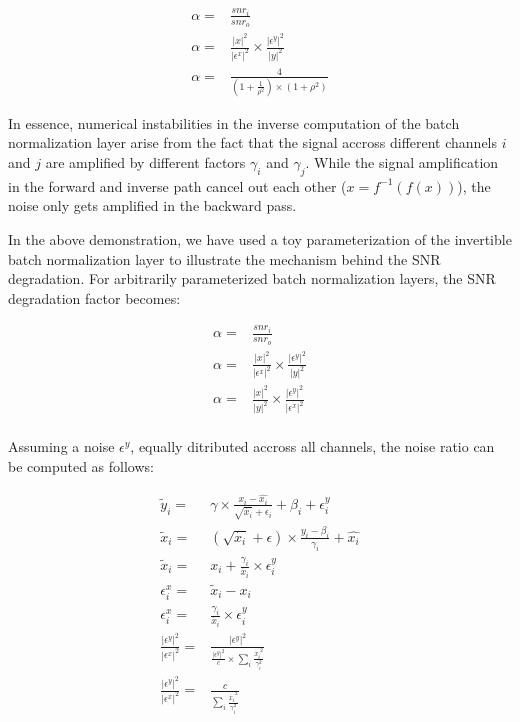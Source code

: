 \documentclass[twocolumn]{bmcart}
\begin{document}
\begin{subequations}
\begin{align}
\alpha =& \frac{snr_i}{snr_o} \\
\alpha =& \frac{|x|^2}{|\epsilon^x|^2} \times  \frac{|\epsilon^y|^2}{|y|^2} \\
\alpha =& \frac{4}{(1+\frac{1}{\rho^2}) \times (1 + \rho^2)}
\end{align}
\end{subequations}

In essence, numerical instabilities in the inverse computation of the batch normalization layer arise 
from the fact that the signal accross different channels $i$ and $j$ are amplified by different factors $\gamma_i$ and $\gamma_j$. 
While the signal amplification in the forward and inverse path cancel out each other ($x=f^{-1}(f(x))$), 
the noise only gets amplified in the backward pass.

In the above demonstration, we have used a toy parameterization of the invertible batch normalization layer to illustrate the mechanism behind the SNR degradation. 
For arbitrarily parameterized batch normalization layers, the SNR degradation factor becomes:

\begin{subequations}
\begin{align}
\alpha =& \frac{snr_i}{snr_o} \\
\alpha =& \frac{|x|^2}{|\epsilon^x|^2} \times  \frac{|\epsilon^y|^2}{|y|^2} \\
\alpha =& \frac{|x|^2}{|y|^2} \times  \frac{|\epsilon^y|^2}{|\epsilon^x|^2} \\
\end{align}
\end{subequations}

Assuming a noise $\epsilon^y$, equally ditributed accross all channels, the noise ratio can be computed as follows:

\begin{subequations}
\begin{align}
\tilde{y}_i  =& \gamma \times \frac{x_i - \hat{x_i}}{\sqrt{\dot{x_i}} + \epsilon_i} + \beta_i + \epsilon^y_i\\
\tilde{x}_i  =& (\sqrt{\dot{x_i}} + \epsilon) \times \frac{y_i -  \beta_i}{\gamma_i}  + \hat{x_i} \\
\tilde{x}_i  =& x_i + \frac{\gamma_i}{\dot{x_i}} \times \epsilon^y_i \\
\epsilon^x_i =& \tilde{x}_i - x_i\\
\epsilon^x_i =& \frac{\gamma_i}{\dot{x_i}} \times \epsilon^y_i\\
\frac{|\epsilon^y|^2}{|\epsilon^x|^2} =& \frac{|\epsilon^y|^2}{\frac{|\epsilon^y|^2}{c} \times \sum_i \frac{\dot{x_i}^2}{\gamma_i^2}} \\
\frac{|\epsilon^y|^2}{|\epsilon^x|^2} =& \frac{c}{\sum_i \frac{\dot{x_i}^2}{\gamma_i^2}}
\end{align}
\end{subequations}
\end{document}
